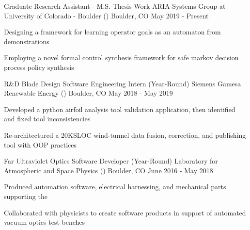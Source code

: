 \begin{cventries}
  \cventry
    {Graduate Research Assistant - M.S. Thesis Work}
    {ARIA Systems Group at University of Colorado - Boulder ()}
    {Boulder, CO}
    {May 2019 - Present}
    {
      \begin{cvitems}
        \item {Designing a framework for learning operator goals as an automaton from demonstrations}
        \item {Employing a novel formal control synthesis framework for safe markov decision process policy synthesis}
      \end{cvitems}
    }
    \cventry
    {R\&D Blade Design Software Engineering Intern (Year-Round)}
    {Siemens Gamesa Renewable Energy ()}
    {Boulder, CO}
    {May 2018 - May 2019}
    {
      \begin{cvitems}
        \item {Developed a python airfoil analysis tool validation application, then identified and fixed tool inconsistencies}
        \item {Re-architectured a 20KSLOC wind-tunnel data fusion, correction, and publishing tool with OOP practices}
      \end{cvitems}
    }

  \cventry
    {Far Ultraviolet Optics Software Developer (Year-Round)}
    {Laboratory for Atmospheric and Space Physics () }
    {Boulder, CO}
    {June 2016 - May 2018}
    {
      \begin{cvitems}
        \item {Produced automation software, electrical harnessing, and mechanical parts supporting the }
        \item {Collaborated with physicists to create software products in support of automated vacuum optics test benches}
      \end{cvitems}
    }
\end{cventries}
